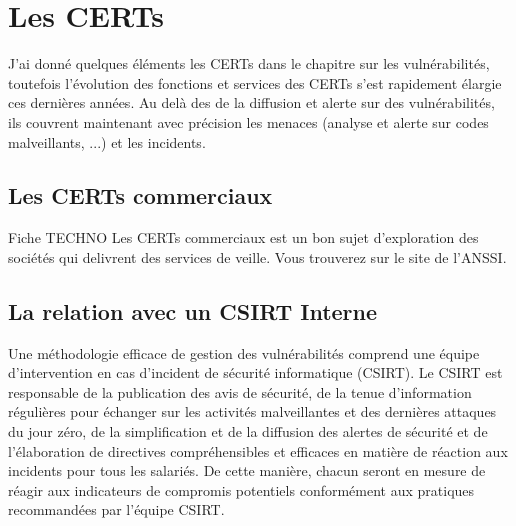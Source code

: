 \uchap{\jobname}

\section{Les CERTs}

J'ai donné quelques éléments les CERTs dans le chapitre sur les vulnérabilités, toutefois l'évolution des fonctions et services des CERTs s'est rapidement élargie ces dernières années. Au delà des de la diffusion et alerte sur des vulnérabilités, ils couvrent maintenant avec précision les menaces (analyse et alerte sur codes malveillants, ...) et les incidents. 

\subsection{Les CERTs commerciaux}

\begin{warningbox}{Fiche TECHNO}
	Les CERTs commerciaux est un bon sujet d'exploration des sociétés qui delivrent des services de veille. Vous trouverez 
	 sur le site de l'ANSSI.
\end{warningbox}

\subsection{La relation avec un CSIRT Interne }

	Une méthodologie efficace de gestion des vulnérabilités comprend une équipe d’intervention en cas d’incident de sécurité informatique (CSIRT). Le CSIRT est responsable de la publication des avis de sécurité, de la tenue d'information régulières pour échanger sur les activités malveillantes et des dernières attaques du jour zéro, de la simplification et de la diffusion des alertes de sécurité et de l’élaboration de directives compréhensibles et efficaces en matière de réaction aux incidents pour tous les salariés. De cette manière, chacun seront en mesure de réagir aux indicateurs de compromis potentiels conformément aux pratiques recommandées par l'équipe CSIRT.